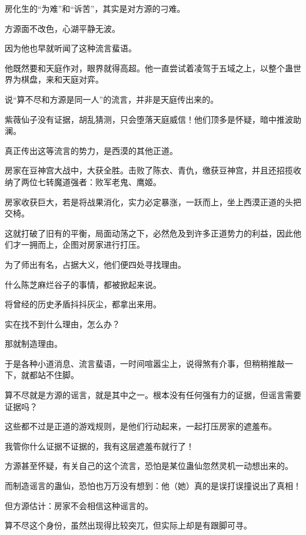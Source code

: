 
\begin{this_body}



房化生的“为难”和“诉苦”，其实是对方源的刁难。

方源面不改色，心湖平静无波。

因为他也早就听闻了这种流言蜚语。

他既然要和天庭作对，眼界就得高超。他一直尝试着凌驾于五域之上，以整个蛊世界为棋盘，来和天庭对弈。

说“算不尽和方源是同一人”的流言，并非是天庭传出来的。

紫薇仙子没有证据，胡乱猜测，只会堕落天庭威信！他们顶多是怀疑，暗中推波助澜。

真正传出这等流言的势力，是西漠的其他正道。

房家在豆神宫大战中，大获全胜。击败了陈衣、青仇，缴获豆神宫，并且还招揽收纳了两位七转魔道强者：败军老鬼、鹰姬。

房家收获巨大，若是将战果消化，实力必定暴涨，一跃而上，坐上西漠正道的头把交椅。

这就打破了旧有的平衡，局面动荡之下，必然危及到许多正道势力的利益，因此他们才一拥而上，企图对房家进行打压。

为了师出有名，占据大义，他们便四处寻找理由。

什么陈芝麻烂谷子的事情，都被掀起来说。

将曾经的历史矛盾抖抖灰尘，都拿出来用。

实在找不到什么理由，怎么办？

那就制造理由。

于是各种小道消息、流言蜚语，一时间喧嚣尘上，说得煞有介事，但稍稍推敲一下，就都站不住脚。

算不尽就是方源的谣言，就是其中之一。根本没有任何强有力的证据，但谣言需要证据吗？

这些都不过是正道的游戏规则，是他们行动起来，一起打压房家的遮羞布。

我管你什么证据不证据的，我有这层遮羞布就行了！

方源甚至怀疑，有关自己的这个流言，恐怕是某位蛊仙忽然灵机一动想出来的。

而制造谣言的蛊仙，恐怕也万万没有想到：他（她）真的是误打误撞说出了真相！

但方源估计：房家不会相信这种谣言的。

算不尽这个身份，虽然出现得比较突兀，但实际上却是有跟脚可寻。


\end{this_body}
